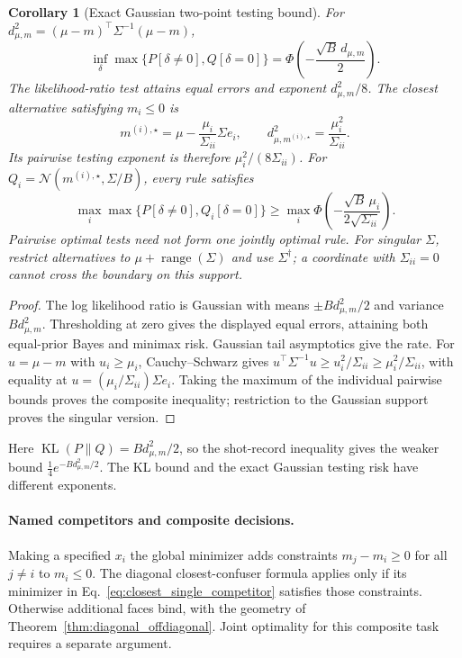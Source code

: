 \documentclass[a4paper,onecolumn,unpublished,nopdfoutputerror]{quantumarticle}
\theoremstyle{plain}
\newtheorem{corollary}[theorem]{Corollary}
\theoremstyle{definition}
\newcommand{\calN}{\mathcal{N}}
\newcommand{\1}{\mathbf{1}}
\newcommand{\KL}{\operatorname{KL}}
\begin{document}
\begin{corollary}[Exact Gaussian two-point testing bound]
\label{cor:twopoint_argmin_converse}
For $d_{\mu,m}^2=(\mu-m)^\top\Sigma^{-1}(\mu-m)$,
\begin{equation}\label{eq:twopoint_pair_bound}
\inf_\delta\max\{P[\delta\ne0],Q[\delta=0]\}
=\Phi\!\left(-\frac{\sqrt B\,d_{\mu,m}}2\right).
\end{equation}
The likelihood-ratio test attains equal errors and exponent $d_{\mu,m}^2/8$. The closest alternative satisfying $m_i\le0$ is
\begin{equation}\label{eq:closest_single_competitor}
m^{(i),\star}=\mu-\frac{\mu_i}{\Sigma_{ii}}\Sigma e_i,
\qquad d_{\mu,m^{(i),\star}}^2=\frac{\mu_i^2}{\Sigma_{ii}}.
\end{equation}
Its pairwise testing exponent is therefore $\mu_i^2/(8\Sigma_{ii})$. For $Q_i=\calN(m^{(i),\star},\Sigma/B)$, every rule satisfies
\begin{equation}\label{eq:twopoint_minimax_argmin}
\max_i\max\{P[\delta\ne0],Q_i[\delta=0]\}
\ge\max_i\Phi\!\left(-\frac{\sqrt B\,\mu_i}{2\sqrt{\Sigma_{ii}}}\right).
\end{equation}
Pairwise optimal tests need not form one jointly optimal rule. For singular $\Sigma$, restrict alternatives to $\mu+\operatorname{range}(\Sigma)$ and use $\Sigma^\dagger$; a coordinate with $\Sigma_{ii}=0$ cannot cross the boundary on this support.
\end{corollary}

\begin{proof}
The log likelihood ratio is Gaussian with means $\pm Bd_{\mu,m}^2/2$ and variance $Bd_{\mu,m}^2$. Thresholding at zero gives the displayed equal errors, attaining both equal-prior Bayes and minimax risk. Gaussian tail asymptotics give the rate. For $u=\mu-m$ with $u_i\ge\mu_i$, Cauchy--Schwarz gives $u^\top\Sigma^{-1}u\ge u_i^2/\Sigma_{ii}\ge\mu_i^2/\Sigma_{ii}$, with equality at $u=(\mu_i/\Sigma_{ii})\Sigma e_i$. Taking the maximum of the individual pairwise bounds proves the composite inequality; restriction to the Gaussian support proves the singular version.
\end{proof}

Here $\KL(P\|Q)=Bd_{\mu,m}^2/2$, so the shot-record inequality gives the weaker bound $\tfrac14e^{-Bd_{\mu,m}^2/2}$. The KL bound and the exact Gaussian testing risk have different exponents.

\paragraph{Named competitors and composite decisions.}
Making a specified $x_i$ the global minimizer adds constraints $m_j-m_i\ge0$ for all $j\ne i$ to $m_i\le0$. The diagonal closest-confuser formula applies only if its minimizer in Eq.~\eqref{eq:closest_single_competitor} satisfies those constraints. Otherwise additional faces bind, with the geometry of Theorem~\ref{thm:diagonal_offdiagonal}. Joint optimality for this composite task requires a separate argument.
\end{document}
